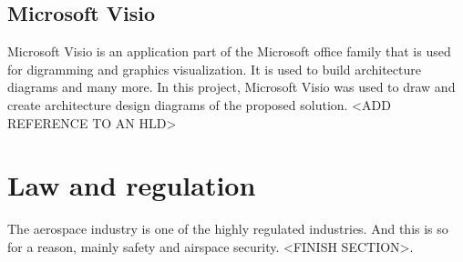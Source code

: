 \subsection{Microsoft Visio}
\label{subsec:ms-visio}
Microsoft Visio is an application part of the Microsoft office family that is used for digramming and graphics visualization. It is used to build architecture diagrams and many more. In this project, Microsoft Visio was used to draw and create architecture design diagrams of the proposed solution.
<ADD REFERENCE TO AN HLD>

\section{Law and regulation}
The aerospace industry is one of the highly regulated industries. And this is so for a reason, mainly safety and airspace security.
<FINISH SECTION>.

